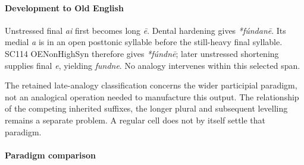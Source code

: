 \documentclass[
  british,
  a4paper,
]{article}
\providecommand{\Recon}[1]{\emph{*#1}}
\begin{document}
\paragraph{Development to Old
English}\label{development-to-old-english-130}

Unstressed final \emph{ai} first becomes long \emph{ē}. Dental hardening
gives \Recon{fúndanē}. Its medial \emph{a} is in an open posttonic
syllable before the still-heavy final syllable. SC114 OENonHighSyn
therefore gives \Recon{fúndnē}; later unstressed shortening supplies
final \emph{e}, yielding {\emph{fundne}}. No analogy intervenes within
this selected span.

The retained late-analogy classification concerns the wider participial
paradigm, not an analogical operation needed to manufacture this output.
The relationship of the competing inherited suffixes, the longer plural
and subsequent levelling remains a separate problem. A regular cell does
not by itself settle that paradigm.

\paragraph{Paradigm comparison}\label{paradigm-comparison-7}
\end{document}
